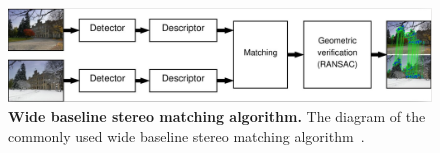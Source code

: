 \begin{figure}[t]
    \begin{center}
        \includegraphics[width=\linewidth]{main/chapter03/data/wbs/wbs_scheme.jpg} 
    \end{center}
    \caption[Wide baseline stereo matching algorithm]{\textbf{Wide baseline stereo matching algorithm.} The diagram of the commonly used wide baseline stereo matching algorithm~\citep{Pritchett1998}.}
    \label{fig:wbs-scheme}
\end{figure}

